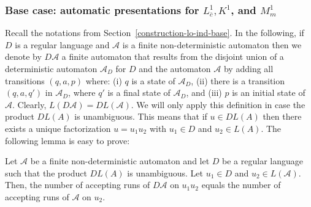 \documentclass[envcountsame]{llncs}
\newcommand{\A}{\mathcal A}
\begin{document}
\subsubsection{Base case: automatic presentations for  $L^1_{\overline{c}},
  K^1$, and $M^1_m$}

Recall the notations from Section~\ref{construction-lo-ind-base}.
In the following, if $D$ is a regular language and
$\A$ is a finite non-deterministic automaton then we denote by $D \A$ a finite
automaton that results from the disjoint union of 
a deterministic automaton $\A_D$ for $D$ and the automaton 
$\A$ by adding all transitions $(q,a,p)$ where:
(i) $q$ is a state of $\A_D$, (ii) there is a transition 
$(q,a,q')$ in $\A_D$, where $q'$ is a final state of $\A_D$, 
and (iii) $p$ is an initial state of $\A$. 
Clearly, $L (D \A) = D L(\A)$. We will only apply this
definition in case the product $D L(A)$ is unambiguous.
This means that if $u \in D L(A)$ then there exists a unique
factorization $u = u_1 u_2$ with $u_1 \in D$ and $u_2 \in L(A)$.
The following lemma is easy to prove:

\begin{lemma} \label{lemma-unambiguous}
Let $\A$ be a finite non-deterministic automaton
and let $D$ be a regular language such that the 
product $D L(A)$ is unambiguous. Let $u_1 \in D$ 
and $u_2 \in L(\A)$. Then, the
number of accepting runs of $D \A$ on $u_1u_2$ 
equals the number of accepting runs of $\A$ on $u_2$.
\end{lemma}
\end{document}
